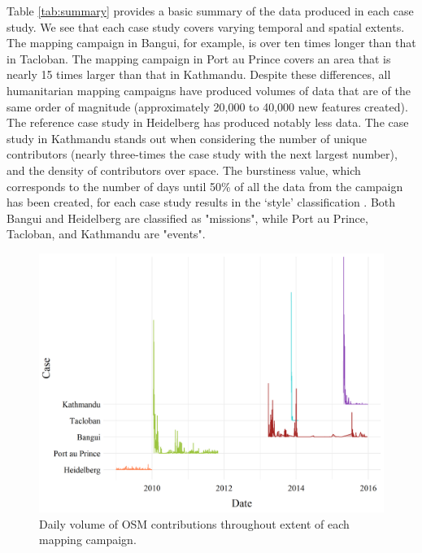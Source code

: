 Table \ref{tab:summary} provides a basic summary of the data produced in each case study. We see that each case study covers varying temporal and spatial extents. The mapping campaign in Bangui, for example, is over ten times longer than that in Tacloban. The mapping campaign in Port au Prince covers an area that is nearly 15 times larger than that in Kathmandu. Despite these differences, all humanitarian mapping campaigns have produced volumes of data that are of the same order of magnitude (approximately 20,000 to 40,000 new features created). The reference case study in Heidelberg has produced notably less data. The case study in Kathmandu stands out when considering the number of unique contributors (nearly three-times the case study with the next largest number), and the density of contributors over space. The burstiness value, which corresponds to the number of days until 50\% of all the data from the campaign has been created, for each case study results in the ‘style’ classification \parencite{dittus_mass_2017}. Both Bangui and Heidelberg are classified as "missions", while Port au Prince, Tacloban, and Kathmandu are "events". 

\begin{figure} %
    \centering %
    \includegraphics[width = \textwidth]{Images/overtime.png} %
    \caption{Daily volume of OSM contributions throughout extent of each mapping campaign.} %
    \label{fig:time} %
\end{figure}

